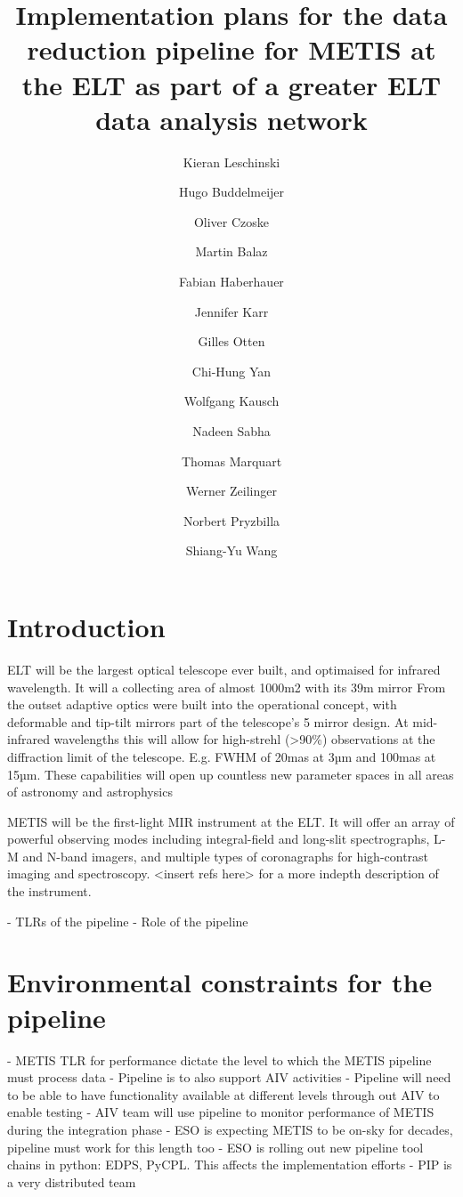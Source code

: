 \documentclass[a4paper]{spie}  %
\title{Implementation plans for the data reduction pipeline for METIS at the ELT as part of a greater ELT data analysis network}
\author[a]{Kieran Leschinski}
\author[a]{Hugo Buddelmeijer}
\author[a]{Oliver Czoske}
\author[a]{Martin Balaz}
\author[a]{Fabian Haberhauer}
\author[a]{Jennifer Karr}
\author[a]{Gilles Otten}
\author[a]{Chi-Hung Yan}
\author[a]{Wolfgang Kausch}
\author[a]{Nadeen Sabha}
\author[a]{Thomas Marquart}
\author[a]{Werner Zeilinger}
\author[a]{Norbert Pryzbilla}
\author[a]{Shiang-Yu Wang}
\affil[a]{University of Vienna, T\"urkenschanztra\ss e 18, 1180 Vienna, Austria}
\begin{document}
 
\maketitle

\begin{abstract}


\end{abstract}



\section{Introduction}
ELT will be the largest optical telescope ever built, and optimaised for infrared wavelength.
It will a collecting area of almost 1000m2 with its 39m mirror 
From the outset adaptive optics were built into the operational concept, with deformable and tip-tilt mirrors part of the telescope's 5 mirror design.
At mid-infrared wavelengths this will allow for high-strehl (>90\%) observations at the diffraction limit of the telescope. 
E.g. FWHM of 20mas at 3µm and 100mas at 15µm.
These capabilities will open up countless new parameter spaces in all areas of astronomy and astrophysics

METIS will be the first-light MIR instrument at the ELT.
It will offer  an array of powerful observing modes including  integral-field and long-slit spectrographs, L-M and N-band imagers, and multiple types of coronagraphs for high-contrast imaging and spectroscopy.
<insert refs here> for a more indepth description of the instrument. 

- TLRs of the pipeline
- Role of the pipeline

\section{Environmental constraints for the pipeline}





- METIS TLR for performance dictate the level to which the METIS pipeline must process data
- Pipeline is to also support AIV activities
- Pipeline will need to be able to have functionality available at different levels through out AIV to enable testing
- AIV team will use pipeline to monitor performance of METIS during the integration phase
- ESO is expecting METIS to be on-sky for decades, pipeline must work for this length too
- ESO is rolling out new pipeline tool chains in python: EDPS, PyCPL. This affects the implementation efforts
- PIP is a very distributed team
\end{document}
